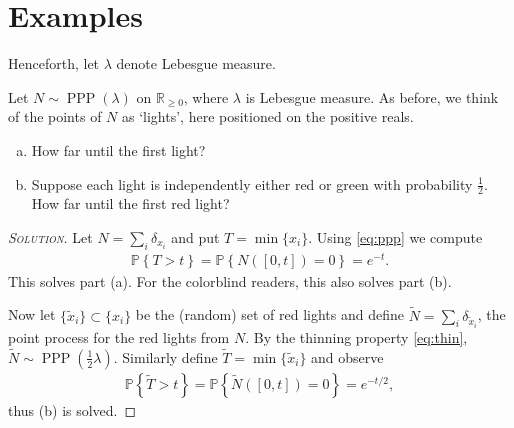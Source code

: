 \documentclass[../../../Master/AppliedStochastics.tex]{subfiles}
\newenvironment{soln}{\begin{proof}[\textsc{Solution}]}{\renewcommand{\qedsymbol}{$\blacklozenge$}\end{proof}}
\begin{document}
\section{Examples}
Henceforth, let $\lambda$ denote Lebesgue measure.
\begin{example}
	Let $N\sim \operatorname{PPP}(\lambda)$ on $\mathbb{R}_{\geq 0}$, where 
	$\lambda$ is Lebesgue measure. As before, we think of the points of $N$ as 
	`lights', here positioned on the positive reals.
	\begin{enumerate}[(a)]
		\item How far until the first light?
		\item Suppose each light is independently either red or green with 
		probability $\frac{1}{2}$. How far until the first red light?
	\end{enumerate}
	\begin{soln}
		Let $N = \sum_i \delta_{x_i}$ and put $T = \min\{x_i\}$. Using 
		\eqref{eq:ppp} we compute
		\begin{align}
			\mathbb{P}\left\{ T > t \right\} = \mathbb{P}\left\{ N([0,t]) = 0 
			\right\} = e^{-t}.
		\end{align}
		This solves part (a). For the colorblind readers, this also solves part 
		(b). 
		
		Now let $\{\tilde{x}_i\}\subset \{x_i\}$ be the (random) set of red 
		lights and define $\widetilde{N} = \sum_i \delta_{\tilde{x}_i}$, the 
		point process for the red lights from $N$. By the thinning property 
		\eqref{eq:thin}, $\widetilde{N} \sim 
		\operatorname{PPP}\left(\frac{1}{2}\lambda\right)$. Similarly define 
		$\widetilde{T} = \min\{\tilde{x}_i\}$ and observe
		\begin{align}
			\mathbb{P}\left\{ \widetilde{T} > t\right\} = \mathbb{P}\left\{ 
			\widetilde{N}([0,t]) = 0 \right\} = e^{-t/2},
		\end{align}
		thus (b) is solved.
	\end{soln}
\end{example}
\end{document}
